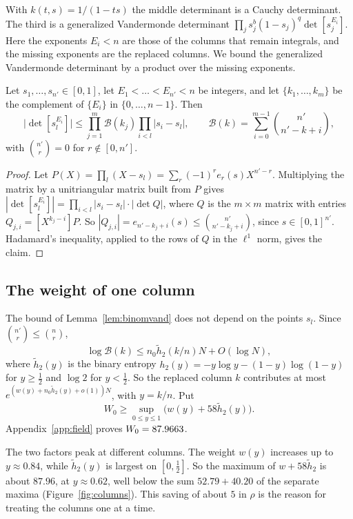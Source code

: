 With $k(t,s)=1/(1-ts)$ the middle determinant is a Cauchy determinant. The third is a generalized
Vandermonde determinant $\prod_js_j^b(1-s_j)^q\det[s_j^{E_i}]$. Here the exponents $E_i<n$ are those of the
columns that remain integrals, and the missing exponents are the replaced columns. We bound the generalized
Vandermonde determinant by a product over the missing exponents.

\begin{lemma}\label{lem:binomvand}
Let $s_1,\ldots,s_{n'}\in[0,1]$, let $E_1<\dots<E_{n'}<n$ be integers, and let $\{k_1,\ldots,k_m\}$ be the
complement of $\{E_i\}$ in $\{0,\ldots,n-1\}$. Then
\[
 \bigl|\det[s_l^{E_i}]\bigr|\le\prod_{j=1}^m\mathcal B(k_j)\prod_{i<l}|s_i-s_l|,\qquad
 \mathcal B(k)=\sum_{i=0}^{m-1}\binom{n'}{n'-k+i},
\]
with $\binom{n'}r=0$ for $r\notin[0,n']$.
\end{lemma}

\begin{proof}
Let $P(X)=\prod_l(X-s_l)=\sum_r(-1)^re_r(s)X^{n'-r}$. Multiplying the matrix by a unitriangular matrix built
from $P$ gives $|\det[s_l^{E_i}]|=\prod_{i<l}|s_i-s_l|\cdot|\det Q|$, where $Q$ is the $m\times m$ matrix with
entries $Q_{j,i}=[X^{k_j-i}]P$. So $|Q_{j,i}|=e_{n'-k_j+i}(s)\le\binom{n'}{n'-k_j+i}$, since $s\in[0,1]^{n'}$.
Hadamard's inequality, applied to the rows of $Q$ in the $\ell^1$ norm, gives the claim.
\end{proof}

\subsection{The weight of one column}\label{ssec:weights}
The bound of Lemma~\ref{lem:binomvand} does not depend on the points $s_l$. Since $\binom{n'}r\le\binom nr$,
\[
 \log\mathcal B(k)\le n_0\tilde h_2(k/n)N+O(\log N),
\]
where $\tilde h_2(y)$ is the binary entropy $h_2(y)=-y\log y-(1-y)\log(1-y)$ for $y\ge\frac12$ and $\log2$ for
$y<\frac12$. So the replaced column $k$ contributes at most $e^{(w(y)+n_0\tilde h_2(y)+o(1))N}$, with $y=k/n$.
Put
\[
 W_0\ge\sup_{0\le y\le1}\bigl(w(y)+58\tilde h_2(y)\bigr).
\]
Appendix~\ref{app:field} proves $W_0=87.9663$.

The two factors peak at different columns. The weight $w(y)$ increases up to $y\approx0.84$, while
$\tilde h_2(y)$ is largest on $[0,\frac12]$. So the maximum of $w+58\tilde h_2$ is about $87.96$, at
$y\approx0.62$, well below the sum $52.79+40.20$ of the separate maxima (Figure~\ref{fig:columns}). This saving of
about $5$ in $\rho$ is the reason for treating the columns one at a time.

